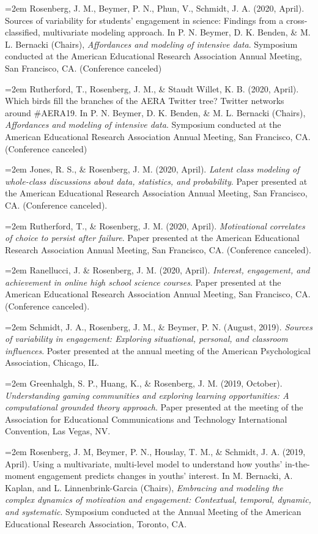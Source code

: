 \documentclass[
  14,
]{article}
\begin{document}
\hangindent=2em Rosenberg, J. M., Beymer, P. N., Phun, V., Schmidt, J.
A. (2020, April). Sources of variability for students' engagement in
science: Findings from a cross-classified, multivariate modeling
approach. In P. N. Beymer, D. K. Benden, \& M. L. Bernacki (Chairs),
\emph{Affordances and modeling of intensive data}. Symposium conducted
at the American Educational Research Association Annual Meeting, San
Francisco, CA. (Conference canceled)

\hangindent=2em Rutherford, T., Rosenberg, J. M., \& Staudt Willet, K.
B. (2020, April). Which birds fill the branches of the AERA Twitter
tree? Twitter networks around \#AERA19. In P. N. Beymer, D. K. Benden,
\& M. L. Bernacki (Chairs), \emph{Affordances and modeling of intensive
data}. Symposium conducted at the American Educational Research
Association Annual Meeting, San Francisco, CA. (Conference canceled)

\hangindent=2em Jones, R. S., \& Rosenberg, J. M. (2020, April).
\emph{Latent class modeling of whole-class discussions about data,
statistics, and probability}. Paper presented at the American
Educational Research Association Annual Meeting, San Francisco, CA.
(Conference canceled).

\hangindent=2em Rutherford, T., \& Rosenberg, J. M. (2020, April).
\emph{Motivational correlates of choice to persist after failure}. Paper
presented at the American Educational Research Association Annual
Meeting, San Francisco, CA. (Conference canceled).

\hangindent=2em Ranellucci, J. \& Rosenberg, J. M. (2020, April).
\emph{Interest, engagement, and achievement in online high school
science courses}. Paper presented at the American Educational Research
Association Annual Meeting, San Francisco, CA. (Conference canceled).

\hangindent=2em Schmidt, J. A., Rosenberg, J. M., \& Beymer, P. N.
(August, 2019). \emph{Sources of variability in engagement: Exploring
situational, personal, and classroom influences}. Poster presented at
the annual meeting of the American Psychological Association, Chicago,
IL.

\hangindent=2em Greenhalgh, S. P., Huang, K., \& Rosenberg, J. M. (2019,
October). \emph{Understanding gaming communities and exploring learning
opportunities: A computational grounded theory approach}. Paper
presented at the meeting of the Association for Educational
Communications and Technology International Convention, Las Vegas, NV.

\hangindent=2em Rosenberg, J. M, Beymer, P. N., Houslay, T. M., \&
Schmidt, J. A. (2019, April). Using a multivariate, multi-level model to
understand how youths' in-the-moment engagement predicts changes in
youths' interest. In M. Bernacki, A. Kaplan, and L. Linnenbrink-Garcia
(Chairs), \emph{Embracing and modeling the complex dynamics of
motivation and engagement: Contextual, temporal, dynamic, and
systematic}. Symposium conducted at the Annual Meeting of the American
Educational Research Association, Toronto, CA.
\end{document}
